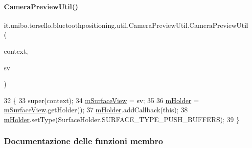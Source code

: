 \paragraph{\texorpdfstring{Camera\+Preview\+Util()}{CameraPreviewUtil()}}
{\footnotesize\ttfamily it.\+unibo.\+torsello.\+bluetoothpositioning.\+util.\+Camera\+Preview\+Util.\+Camera\+Preview\+Util (\begin{DoxyParamCaption}\item[{Context}]{context,  }\item[{Surface\+View}]{sv }\end{DoxyParamCaption})}


\begin{DoxyCode}
32                                                               \{
33         super(context);
34         \hyperlink{classit_1_1unibo_1_1torsello_1_1bluetoothpositioning_1_1util_1_1CameraPreviewUtil_a41e834d4998c7df0228da7b4b517f9b0_a41e834d4998c7df0228da7b4b517f9b0}{mSurfaceView} = sv;
35 
36         \hyperlink{classit_1_1unibo_1_1torsello_1_1bluetoothpositioning_1_1util_1_1CameraPreviewUtil_ad2698fd1398d4a6491b1e0b071a956db_ad2698fd1398d4a6491b1e0b071a956db}{mHolder} = \hyperlink{classit_1_1unibo_1_1torsello_1_1bluetoothpositioning_1_1util_1_1CameraPreviewUtil_a41e834d4998c7df0228da7b4b517f9b0_a41e834d4998c7df0228da7b4b517f9b0}{mSurfaceView}.getHolder();
37         \hyperlink{classit_1_1unibo_1_1torsello_1_1bluetoothpositioning_1_1util_1_1CameraPreviewUtil_ad2698fd1398d4a6491b1e0b071a956db_ad2698fd1398d4a6491b1e0b071a956db}{mHolder}.addCallback(\textcolor{keyword}{this});
38         \hyperlink{classit_1_1unibo_1_1torsello_1_1bluetoothpositioning_1_1util_1_1CameraPreviewUtil_ad2698fd1398d4a6491b1e0b071a956db_ad2698fd1398d4a6491b1e0b071a956db}{mHolder}.setType(SurfaceHolder.SURFACE\_TYPE\_PUSH\_BUFFERS);
39     \}
\end{DoxyCode}


\subsubsection{Documentazione delle funzioni membro}
\hypertarget{classit_1_1unibo_1_1torsello_1_1bluetoothpositioning_1_1util_1_1CameraPreviewUtil_a3a4253aa9b4df3659a6f7bb80be84256_a3a4253aa9b4df3659a6f7bb80be84256}{}\label{classit_1_1unibo_1_1torsello_1_1bluetoothpositioning_1_1util_1_1CameraPreviewUtil_a3a4253aa9b4df3659a6f7bb80be84256_a3a4253aa9b4df3659a6f7bb80be84256} 
